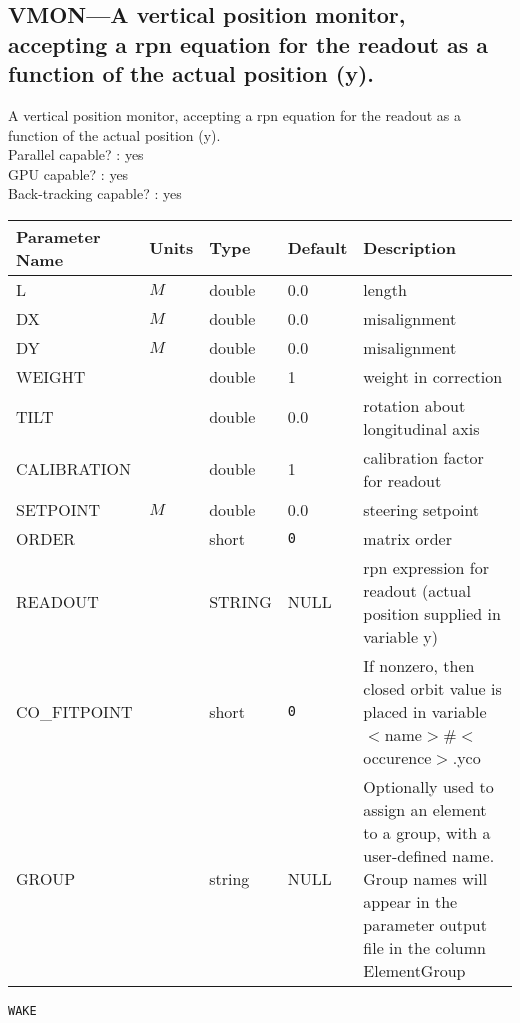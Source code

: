 \subsection{VMON---A vertical position monitor, accepting a rpn equation for the readout as a function of the actual position (y).}
A vertical position monitor, accepting a rpn equation for the readout as a function of the actual position (y).
\\
Parallel capable? : yes\\
GPU capable? : yes\\
Back-tracking capable? : yes\\
\begin{tabular}{|l|l|l|l|p{\descwidth}|} \hline
Parameter Name & Units & Type & Default & Description \\ \hline 
L & $M$ & double &  0.0 & length  \\ \hline 
DX & $M$ & double &  0.0 & misalignment  \\ \hline 
DY & $M$ & double &  0.0 & misalignment  \\ \hline 
WEIGHT &  & double &   1 & weight in correction  \\ \hline 
TILT &  & double &  0.0 & rotation about longitudinal axis  \\ \hline 
CALIBRATION &  & double &   1 & calibration factor for readout  \\ \hline 
SETPOINT & $M$ & double &  0.0 & steering setpoint  \\ \hline 
ORDER &  & short &  \verb|0| & matrix order  \\ \hline 
READOUT &  & STRING &   NULL            & rpn expression for readout (actual position supplied in variable y)  \\ \hline 
CO\_FITPOINT &  & short &  \verb|0| & If nonzero, then closed orbit value is placed in variable $<$name$>$\#$<$occurence$>$.yco  \\ \hline 
GROUP &  & string & NULL & Optionally used to assign an element to a group, with a user-defined name.  Group names will appear in the parameter output file in the column ElementGroup  \\ \hline 
\end{tabular}

\newpage
\begin{center}{\Large\verb|WAKE|}\end{center}
